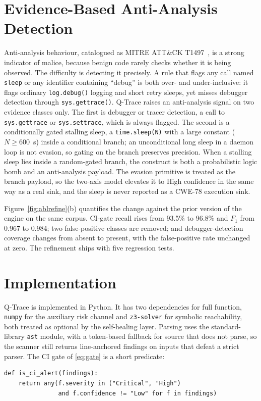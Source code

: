 \documentclass[runningheads]{llncs}
\newcommand{\pct}{\%}
\begin{document}
\section{Evidence-Based Anti-Analysis Detection}\label{sec:anti}
Anti-analysis behaviour, catalogued as MITRE ATT\&CK T1497~\cite{attack}, is a
strong indicator of malice, because benign code rarely checks whether it is being
observed. The difficulty is detecting it precisely. A rule that flags any call
named \texttt{sleep} or any identifier containing ``debug'' is both over- and
under-inclusive: it flags ordinary \texttt{log.debug()} logging and short retry
sleeps, yet misses debugger detection through \texttt{sys.gettrace()}. Q-Trace
raises an anti-analysis signal on two evidence classes only. The first is
debugger or tracer detection, a call to \texttt{sys.gettrace} or
\texttt{sys.settrace}, which is always flagged. The second is a conditionally
gated stalling sleep, a \texttt{time.sleep(N)} with a large constant
($N \geq 600$~s) inside a conditional branch; an unconditional long sleep in a
daemon loop is not evasion, so gating on the branch preserves precision. When a
stalling sleep lies inside a random-gated branch, the construct is both a
probabilistic logic bomb and an anti-analysis payload. The evasion primitive is
treated as the branch payload, so the two-axis model elevates it to High
confidence in the same way as a real sink, and the sleep is never reported as a
CWE-78 execution sink.

Figure~\ref{fig:ablrefine}(b) quantifies the change against the prior version of
the engine on the same corpus. CI-gate recall rises from 93.5\pct{} to 96.8\pct{}
and $F_1$ from 0.967 to 0.984; two false-positive classes are removed; and
debugger-detection coverage changes from absent to present, with the
false-positive rate unchanged at zero. The refinement ships with five regression
tests.

\section{Implementation}\label{sec:impl}
Q-Trace is implemented in Python. It has two dependencies for full function,
\texttt{numpy} for the auxiliary risk channel and \texttt{z3-solver} for symbolic
reachability, both treated as optional by the self-healing layer. Parsing uses the
standard-library \texttt{ast} module, with a token-based fallback for source that
does not parse, so the scanner still returns line-anchored findings on inputs that
defeat a strict parser. The CI gate of \eqref{eq:gate} is a short predicate:
\begin{lstlisting}
def is_ci_alert(findings):
    return any(f.severity in ("Critical", "High")
               and f.confidence != "Low" for f in findings)
\end{lstlisting}
\end{document}
